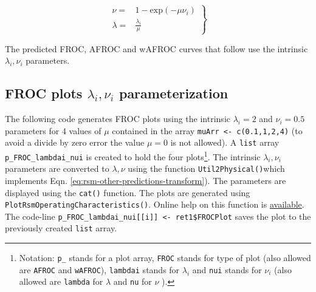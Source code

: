 \documentclass[
]{book}
\begin{document}
\begin{equation}
\left. 
\begin{aligned}
\nu =& 1 - \text{exp}\left ( - \mu \nu_i \right ) \\
\lambda =& \frac{\lambda_i}{\mu}
\end{aligned}
\right \}
\label{eq:rsm-other-predictions-transform}
\end{equation}

The predicted FROC, AFROC and wAFROC curves that follow use the intrinsic \(\lambda_i, \nu_i\) parameters.

\hypertarget{froc-plots-lambda_i-nu_i-parameterization}{%
\subsection{\texorpdfstring{FROC plots \(\lambda_i, \nu_i\) parameterization}{FROC plots \textbackslash lambda\_i, \textbackslash nu\_i parameterization}}\label{froc-plots-lambda_i-nu_i-parameterization}}

The following code generates FROC plots using the intrinsic \(\lambda_i = 2\) and \(\nu_i = 0.5\) parameters for 4 values of \(\mu\) contained in the array \texttt{muArr\ \textless{}-\ c(0.1,1,2,4)} (to avoid a divide by zero error the value \(\mu=0\) is not allowed). A \texttt{list} array \texttt{p\_FROC\_lambdai\_nui} is created to hold the four plots\footnote{Notation: \texttt{p\_} stands for a plot array, \texttt{FROC} stands for type of plot (also allowed are \texttt{AFROC} and \texttt{wAFROC}), \texttt{lambdai} stands for \(\lambda_i\) and \texttt{nui} stands for \(\nu_i\) (also allowed are \texttt{lambda} for \(\lambda\) and \texttt{nu} for \(\nu\) ).}. The intrinsic \(\lambda_i, \nu_i\) parameters are converted to \(\lambda, \nu\) using the function \texttt{Util2Physical()}which implements Eqn. \eqref{eq:rsm-other-predictions-transform}). The parameters are displayed using the \texttt{cat()} function. The plots are generated using \texttt{PlotRsmOperatingCharacteristics()}. Online help on this function is \href{https://dpc10ster.github.io/RJafroc/reference/PlotRsmOperatingCharacteristics.html}{available}. The code-line \texttt{p\_FROC\_lambdai\_nui{[}{[}i{]}{]}\ \textless{}-\ ret1\$FROCPlot} saves the plot to the previously created \texttt{list} array.
\end{document}
